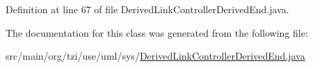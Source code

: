 Definition at line 67 of file Derived\-Link\-Controller\-Derived\-End.\-java.



The documentation for this class was generated from the following file\-:\begin{DoxyCompactItemize}
\item 
src/main/org/tzi/use/uml/sys/\hyperlink{_derived_link_controller_derived_end_8java}{Derived\-Link\-Controller\-Derived\-End.\-java}\end{DoxyCompactItemize}
